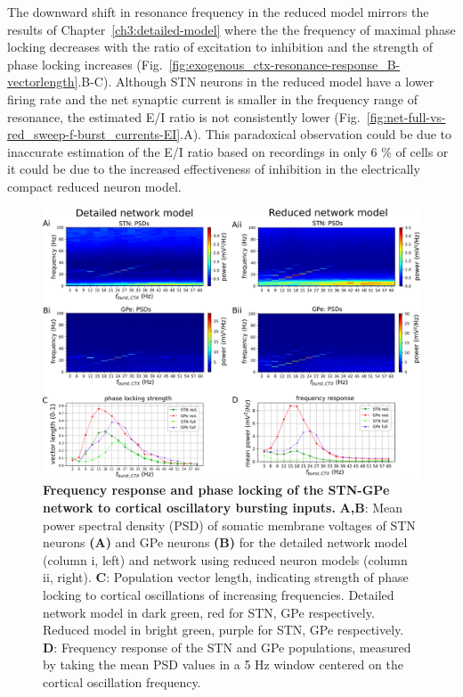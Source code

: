 The downward shift in resonance frequency in the reduced model mirrors the
results of Chapter~\ref{ch3:detailed-model} where the the frequency of maximal
phase locking decreases with the ratio of excitation to inhibition and the strength
of phase locking increases (Fig.~\ref{fig:exogenous_ctx-resonance-response_B-vectorlength}.B-C).
Although STN neurons in the reduced model have a lower firing rate and the net
synaptic current is smaller in the frequency range of resonance, the estimated E/I ratio is not
consistently lower (Fig.~\ref{fig:net-full-vs-red_sweep-f-burst_currents-EI}.A).
%
This paradoxical observation could be due to inaccurate estimation of the E/I ratio
based on recordings in only 6 \% of cells or it could be due to the increased effectiveness
of inhibition in the electrically compact reduced neuron model.
%
%
%
%
%
%
%
%
%
%
%
%

\begin{figure}[ht]
\centering
\includegraphics[width=\textwidth]{ch_reduced_model/figs/fig_net-full-vs-red_sweep-f-burst-ctx.png}
\caption{
\textbf{Frequency response and phase locking of the STN-GPe network to cortical oscillatory bursting inputs.}
\textbf{A,B}: Mean power spectral density (PSD) of somatic membrane voltages of STN neurons \textbf{(A)} and GPe neurons \textbf{(B)} for the detailed network model (column i, left) and network using reduced neuron models
(column ii, right).
\textbf{C}: Population vector length, indicating strength of phase locking to cortical oscillations of increasing frequencies. Detailed network model in dark green, red for STN, GPe respectively. Reduced model in bright green, purple for STN, GPe respectively.
\textbf{D}: Frequency response of the STN and GPe populations, measured by taking the mean PSD values in a 5 Hz window centered on the cortical oscillation frequency.
}
\label{fig:net-full-vs-red_sweep-f-burst}
\end{figure}

